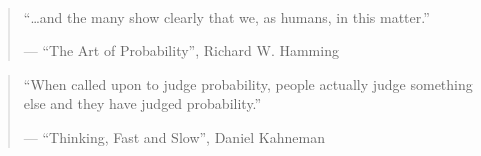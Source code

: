 
\begin{frame}{}
  \begin{columns}
      \pause
  \end{columns}

  \pause
  \vspace{0.50cm}
  \begin{center}
    {} \\[5pt] \pause
    {}
  \end{center}
\end{frame}

\begin{frame}{}
  \begin{columns}
  \end{columns}

  \vspace{0.50cm}
  \begin{quote}
    ``\ldots and the many  show clearly that we, as humans, 
     in this matter.''

    \hfill --- {\small ``The Art of Probability'', Richard W. Hamming}
  \end{quote}

  \pause
  \begin{quote}
    ``When called upon to judge probability, people actually judge something else
    and  they have judged probability.''

    \hfill --- {\small ``Thinking, Fast and Slow'', Daniel Kahneman}
  \end{quote}
\end{frame}

\begin{frame}{}

  \pause
  \vspace{0.50cm}
  \begin{quote}
    \centerline{}
  \end{quote}
\end{frame}

